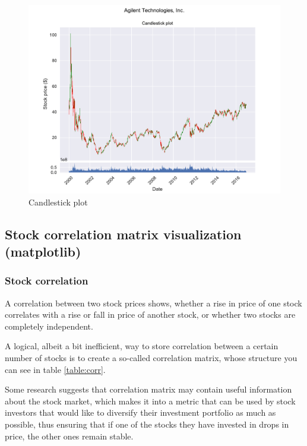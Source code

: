 \documentclass[12pt, a4paper]{article}
\begin{document}
\begin{figure}[H]
    \centering
    \includegraphics[width=\textwidth]{src/stocks/simple/candlestick}
    \caption{Candlestick plot}
    \label{fig:stock_candlestick}
\end{figure}


\subsection{Stock correlation matrix visualization (matplotlib)} \label{ssec:stock_corr}

\subsubsection{Stock correlation}

A correlation between two stock prices shows, whether a rise in price of one stock correlates with a rise or fall in price of another stock, or whether two stocks are completely independent.

A logical, albeit a bit inefficient, way to store correlation between a certain number of stocks is to create a so-called correlation matrix, whose structure you can see in table \ref{table:corr}.

Some research\cite{kwapien2006bulk} suggests that correlation matrix may contain useful information about the stock market, which makes it into a metric that can be used by stock investors that would like to diversify their investment portfolio as much as possible, thus ensuring that if one of the stocks they have invested in drops in price, the other ones remain stable.
\end{document}
